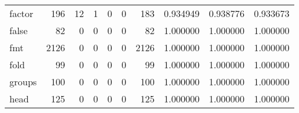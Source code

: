 \begin{tabular}{lrrrrrrrrr}
factor    &                                                196 &                                                 12 &                                                  1 &                                                  0 &                                                  0 &                                                183 &                                           0.934949 &                               0.938776 &                             0.933673 \\
false     &                                                 82 &                                                  0 &                                                  0 &                                                  0 &                                                  0 &                                                 82 &                                           1.000000 &                               1.000000 &                             1.000000 \\
fmt       &                                               2126 &                                                  0 &                                                  0 &                                                  0 &                                                  0 &                                               2126 &                                           1.000000 &                               1.000000 &                             1.000000 \\
fold      &                                                 99 &                                                  0 &                                                  0 &                                                  0 &                                                  0 &                                                 99 &                                           1.000000 &                               1.000000 &                             1.000000 \\
groups    &                                                100 &                                                  0 &                                                  0 &                                                  0 &                                                  0 &                                                100 &                                           1.000000 &                               1.000000 &                             1.000000 \\
head      &                                                125 &                                                  0 &                                                  0 &                                                  0 &                                                  0 &                                                125 &                                           1.000000 &                               1.000000 &                             1.000000 \\

\end{tabular}

